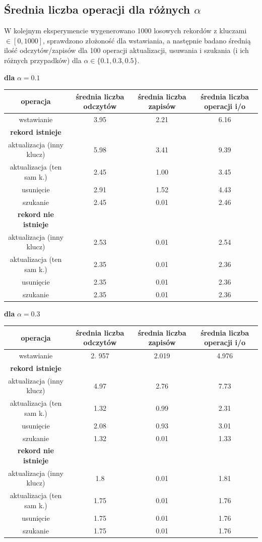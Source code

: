 \documentclass{article}
\begin{document}
\subsection{Średnia liczba operacji dla różnych $\alpha$}
W kolejnym eksperymencie  wygenerowano 1000 losowych rekordów z kluczami $\in [0, 1000]$, sprawdzono złożoność dla wstawiania, a następnie badano średnią ilość odczytów/zapisów dla 100 operacji aktualizacji, usuwania i szukania (i ich różnych przypadków)
dla $\alpha \in \{0.1, 0.3, 0.5\}$. 
\begin{center}
\textbf{dla} $\alpha = 0.1$ \\
\begin{tabular}{ c | c c | c}
 operacja & średnia liczba odczytów & średnia liczba zapisów & średnia liczba operacji i/o \\ 
\hline
 wstawianie & 3.95 & 2.21 & 6.16 \\  
 \hline 
 \textbf{rekord istnieje}\\
 aktualizacja (inny klucz) &  5.98 & 3.41 & 9.39 \\
 aktualizacja (ten sam k.) & 2.45 & 1.00 & 3.45 \\
 usunięcie & 2.91 & 1.52 & 4.43 \\
 szukanie & 2.45 & 0.01 & 2.46\\
 \hline
 \textbf{rekord nie istnieje} \\
 aktualizacja (inny klucz) & 2.53 & 0.01 & 2.54 \\
 aktualizacja (ten sam k.) & 2.35 & 0.01 & 2.36\\
 usunięcie & 2.35 & 0.01 & 2.36\\
 szukanie & 2.35 & 0.01 & 2.36 \\
\hline \hline
\end{tabular}
\end{center}
\begin{center}
\textbf{dla} $\alpha = 0.3$ \\
\begin{tabular}{ c | c c | c}
 operacja & średnia liczba odczytów & średnia liczba zapisów & średnia liczba operacji i/o \\ 
\hline
 wstawianie & 2. 957& 2.019 & 4.976 \\  
 \hline 
 \textbf{rekord istnieje}\\
 aktualizacja (inny klucz) &  4.97 & 2.76 & 7.73 \\
 aktualizacja (ten sam k.) & 1.32 & 0.99 & 2.31 \\
 usunięcie & 2.08 & 0.93 & 3.01 \\
 szukanie & 1.32 & 0.01 & 1.33 \\
 \hline
 \textbf{rekord nie istnieje} \\
 aktualizacja (inny klucz) & 1.8 & 0.01 & 1.81\\
 aktualizacja (ten sam k.) & 1.75 & 0.01 & 1.76\\
 usunięcie  & 1.75 & 0.01 & 1.76\\
 szukanie & 1.75 & 0.01 & 1.76\\
\hline \hline
\end{tabular}
\end{center}
\end{document}
